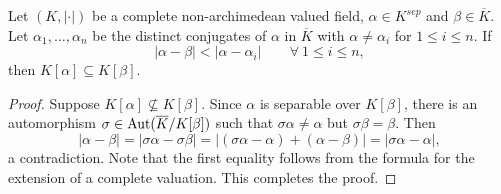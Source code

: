 \begin{lemma}[Krasner]
    Let $(K, |\cdot|)$ be a complete non-archimedean valued field, $\alpha\in K^{sep}$ and $\beta\in\overline K$. Let $\alpha_1,\dots,\alpha_n$ be the distinct conjugates of $\alpha$ in $\overline K$ with $\alpha\ne\alpha_i$ for $1\le i\le n$. If 
    \begin{equation*}
        |\alpha - \beta| < |\alpha - \alpha_i|\qquad\forall~1\le i\le n,
    \end{equation*}
    then $K[\alpha]\subseteq K[\beta]$.
\end{lemma}
\begin{proof}
    Suppose $K[\alpha]\not\subseteq K[\beta]$. Since $\alpha$ is separable over $K[\beta]$, there is an automorphism $\sigma\in\operatorname{Aut}(\overline K/K[\beta])$ such that $\sigma\alpha\ne\alpha$ but $\sigma\beta = \beta$. Then 
    \begin{equation*}
        |\alpha - \beta| = |\sigma\alpha - \sigma\beta| = \left|(\sigma\alpha - \alpha) + (\alpha - \beta)\right| = |\sigma\alpha - \alpha|,
    \end{equation*}
    a contradiction. Note that the first equality follows from the formula for the extension of a complete valuation. This completes the proof.
\end{proof}

